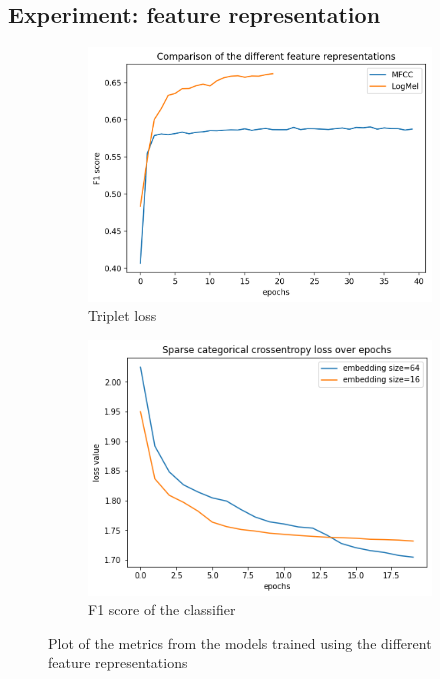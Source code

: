 \subsection{Experiment: feature representation}
\label{sub:Experiment-Feature-Representation}
\begin{figure}[htb]
\centering
\begin{subfigure}{.5\linewidth}
  \centering
  \includegraphics[width=.9\linewidth]{study-doc/experiment_feature/assets/f1_feature_representation.png}
  \caption{Triplet loss}
  \label{fig:plot-triplet-loss-feature-representations}
\end{subfigure}%
\begin{subfigure}{.5\linewidth}
  \centering
  \includegraphics[width=.9\linewidth]{study-doc/experiment_embedding_size/assets/classifier_loss.png}
  \caption{F1 score of the classifier}
  \label{fig:classifier-f1-feature-represenations}
\end{subfigure}
\caption{Plot of the metrics from the models trained using the different feature representations}
\label{fig:feature-experiment-metrics}
\end{figure}
